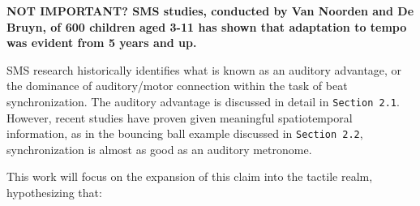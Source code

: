 \textbf{NOT IMPORTANT? SMS studies, conducted by Van Noorden and De Bruyn, of 600 children aged 3-11 has shown that adaptation to tempo was evident from 5 years and up. \cite{repp2013sensorimotor} }

SMS research historically identifies what is known as an auditory advantage, or the dominance of auditory/motor connection within the task of beat synchronization. The auditory advantage is discussed in detail in \verb!Section 2.1!. However, recent studies have proven given meaningful spatiotemporal information, as in the bouncing ball example discussed in \verb!Section 2.2!, synchronization is almost as good as an auditory metronome.

This work will focus on the expansion of this claim into the tactile realm, hypothesizing that:
